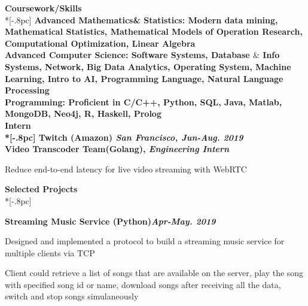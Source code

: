 {\large \bf Coursework/Skills} \\*[-.8pc]
\underline{\hspace{7in}} 
\bf Advanced Mathematics\& Statistics: \rm  Modern data mining, Mathematical Statistics, Mathematical Models of Operation Research, Computational Optimization, Linear Algebra\\
\bf Advanced Computer Science: \rm  Software Systems, Database $\&$ Info Systems, Network, Big Data Analytics, Operating System, Machine Learning, Intro to AI, Programming Language, Natural Language Processing\\
\bf Programming: \rm Proficient in C/C++, Python, SQL, Java, Matlab,  MongoDB, Neo4j, R, Haskell, Prolog\\


{\large \bf Intern} \\*[-.8pc]
\underline{\hspace{7in}} 
{\bf Twitch (Amazon) \hfill \it  San Francisco, Jun-Aug. 2019}\\

\vspace{-4mm}
 \rm  Video Transcoder Team(Golang), \it Engineering Intern \rm 
\begin{list2}

\item Reduce end-to-end latency for live video streaming with WebRTC\\
\end{list2}



{\large \bf Selected Projects} \\*[-.8pc]
\underline{\hspace{7in}} 

\bf Streaming Music Service (Python)\hfill{\it Apr-May. 2019}\rm\\
\vspace{-4mm}
\begin{list2}
\item Designed and implemented a protocol to build a streaming music service for multiple clients via TCP
\item Client could retrieve a list of songs that are available on the server, play the song with specified song id or name, download songs after receiving all the data, switch and stop songs
simulaneously
\end{list2}




